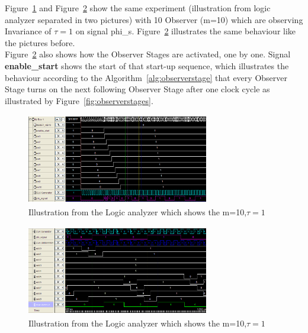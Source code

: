 Figure~\ref{fig:logicanalyzer:m10:t1:1} and Figure~\ref{fig:logicanalyzer:m10:t1:2} show the same experiment (illustration from logic analyzer separated in two pictures) 
with 10 Observer (m=10) which are observing Invariance of $\tau = 1$ on signal phi\_s. 
Figure~\ref{fig:logicanalyzer:m10:t1:2} illustrates the same behaviour like the pictures before. \\
Figure~\ref{fig:logicanalyzer:m10:t1:2} also shows how the Observer Stages are activated, one by one. 
Signal \textbf{enable\_start} shows the start of that start-up sequence, which illustrates the behaviour according to the Algorithm~\ref{alg:observerstage} that 
every Observer Stage turns on the next following Observer Stage after one clock cycle as illustrated by Figure~\ref{fig:observerstages}. \\
\begin{figure}[]
\centering
\includegraphics[width=300px,height=150px]{../../pictures/Logicanalyzer/10_Observer_Tau_1_2.png}
\caption[Logicanalyzer m=10,$\tau = 1$]{Illustration from the Logic analyzer which shows the m=10,$\tau = 1$}
\label{fig:logicanalyzer:m10:t1:1}
\end{figure}


\begin{figure}[]
\centering
\includegraphics[width=300px,height=150px]{../../pictures/Logicanalyzer/10_Observer_Tau_1_1.png}
\caption[Logicanalyzer m=10,$\tau = 1$]{Illustration from the Logic analyzer which shows the m=10,$\tau = 1$}
\label{fig:logicanalyzer:m10:t1:2}
\end{figure}


